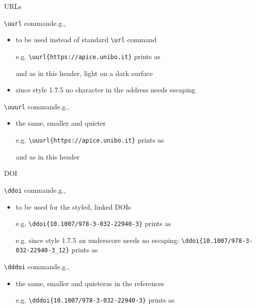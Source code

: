 \documentclass[presentation,cesena,apice]{beamer}\mode<presentation>{\usetheme{AMSBolognaFC}}
\begin{document}
\begin{frame}[c,fragile]{URLs}
%
\begin{block}{\texttt{\textbackslash{}uurl} command\textemdash{}e.g., }
\begin{itemize}
	\item to be used instead of standard \texttt{\textbackslash{}url} command
	\item[e.g.] \verb|| prints as \uurl{https://apice.unibo.it}
	\item[] and as in this header, light on a dark surface
	\item since style 1.7.5 no character in the address needs escaping
\end{itemize}
\end{block}
%
\begin{block}{\texttt{\textbackslash{}uuurl} command\textemdash{}e.g., }
\begin{itemize}
	\item the same, smaller and quieter
	\item[e.g.] \verb|| prints as \uuurl{https://apice.unibo.it}
	\item[] and as in this header
\end{itemize}
\end{block}
%
\end{frame}

\begin{frame}[c,fragile]{DOI}
%
\begin{block}{\texttt{\textbackslash{}ddoi} command\textemdash{}e.g., } %
\begin{itemize}
	\item to be used for the styled, linked DOIs
	\item[e.g.] \verb|\ddoi{10.1007/978-3-032-22940-3}| prints as  %
	\item[e.g.] since style 1.7.5 an underscore needs no escaping: \verb|\ddoi{10.1007/978-3-032-22940-3_12}| prints as  %
\end{itemize}
\end{block}
%
\begin{block}{\texttt{\textbackslash{}dddoi} command\textemdash{}e.g., } %
\begin{itemize}
	\item the same, smaller and quieter\textemdash{}as in the references
	\item[e.g.] \verb|\dddoi{10.1007/978-3-032-22940-3}| prints as  %
\end{itemize}
\end{block}
%
\end{frame}
\end{document}
